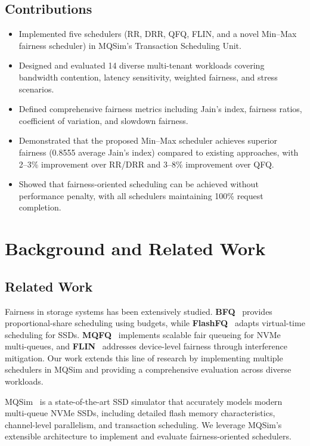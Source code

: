 \documentclass[11pt]{article}
\begin{document}
\subsection*{Contributions}
\begin{itemize}
    \item Implemented five schedulers (RR, DRR, QFQ, FLIN, and a novel Min--Max fairness scheduler) in MQSim's Transaction Scheduling Unit.
    \item Designed and evaluated 14 diverse multi-tenant workloads covering bandwidth contention, latency sensitivity, weighted fairness, and stress scenarios.
    \item Defined comprehensive fairness metrics including Jain's index, fairness ratios, coefficient of variation, and slowdown fairness.
    \item Demonstrated that the proposed Min--Max scheduler achieves superior fairness (0.8555 average Jain's index) compared to existing approaches, with 2--3\% improvement over RR/DRR and 3--8\% improvement over QFQ.
    \item Showed that fairness-oriented scheduling can be achieved without performance penalty, with all schedulers maintaining 100\% request completion.
\end{itemize}

\section{Background and Related Work}

\subsection{Related Work}

Fairness in storage systems has been extensively studied. \textbf{BFQ}~\cite{bfq} provides proportional-share scheduling using budgets, while \textbf{FlashFQ}~\cite{flashfq} adapts virtual-time scheduling for SSDs. \textbf{MQFQ}~\cite{mqfq} implements scalable fair queueing for NVMe multi-queues, and \textbf{FLIN}~\cite{flin} addresses device-level fairness through interference mitigation. Our work extends this line of research by implementing multiple schedulers in MQSim and providing a comprehensive evaluation across diverse workloads.

MQSim~\cite{mqsim} is a state-of-the-art SSD simulator that accurately models modern multi-queue NVMe SSDs, including detailed flash memory characteristics, channel-level parallelism, and transaction scheduling. We leverage MQSim's extensible architecture to implement and evaluate fairness-oriented schedulers.
\end{document}
